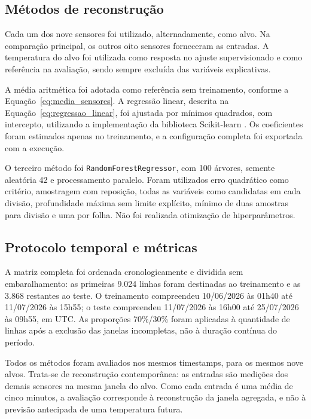 \subsection{Métodos de reconstrução}
\label{subsec:metodos_reconstrucao}

Cada um dos nove sensores foi utilizado, alternadamente, como alvo.
Na comparação principal, os outros oito sensores forneceram as
entradas. A temperatura do alvo foi utilizada como resposta no
ajuste supervisionado e como referência na avaliação, sendo sempre
excluída das variáveis explicativas.

A média aritmética foi adotada como referência sem treinamento,
conforme a Equação~\ref{eq:media_sensores}. A regressão linear, descrita
na Equação~\ref{eq:regressao_linear}, foi ajustada por mínimos quadrados,
com intercepto, utilizando a implementação da biblioteca Scikit-learn
\cite{pedregosa2011scikit}. Os coeficientes foram estimados apenas no
treinamento, e a configuração completa foi exportada com a execução.

O terceiro método foi \texttt{RandomForestRegressor}, com 100 árvores,
semente aleatória 42 e processamento paralelo. Foram utilizados erro
quadrático como critério, amostragem com reposição, todas as variáveis
como candidatas em cada divisão, profundidade máxima sem limite
explícito, mínimo de duas amostras para divisão e uma por folha.
Não foi realizada otimização de hiperparâmetros.

\subsection{Protocolo temporal e métricas}
\label{subsec:protocolo_avaliacao}

A matriz completa foi ordenada cronologicamente e dividida sem
embaralhamento: as primeiras 9.024 linhas foram destinadas ao
treinamento e as 3.868 restantes ao teste. O treinamento compreendeu
10/06/2026 às 01h40 até 11/07/2026 às 15h55; o teste compreendeu
11/07/2026 às 16h00 até 25/07/2026 às 09h55, em UTC. As proporções
70\%/30\% foram aplicadas à quantidade de linhas após a exclusão
das janelas incompletas, não à duração contínua do período.

Todos os métodos foram avaliados nos mesmos timestamps, para os
mesmos nove alvos. Trata-se de reconstrução contemporânea: as entradas
são medições dos demais sensores na mesma janela do alvo. Como cada
entrada é uma média de cinco minutos, a avaliação corresponde à
reconstrução da janela agregada, e não à previsão antecipada de
uma temperatura futura.

